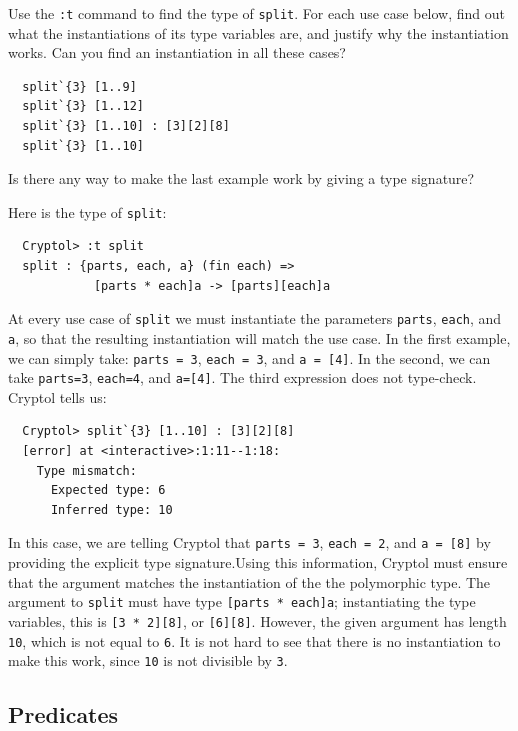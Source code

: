\begin{Exercise}\label{ex:poly:split}\indGroup
  Use the \texttt{:t} command to find the type of \texttt{split}. For
  each use case below, find out what the instantiations of its type
  variables are, and justify why the instantiation works. Can you find
  an instantiation in all these cases?
\begin{Verbatim}
  split`{3} [1..9]
  split`{3} [1..12]
  split`{3} [1..10] : [3][2][8]
  split`{3} [1..10]
\end{Verbatim}
Is there any way to make the last example work by giving a type signature?
\end{Exercise}
\begin{Answer}\indGroup
Here is the type of \texttt{split}:
\begin{Verbatim}
  Cryptol> :t split
  split : {parts, each, a} (fin each) =>
            [parts * each]a -> [parts][each]a
\end{Verbatim}
At every use case of \texttt{split} we must instantiate the parameters
\texttt{parts}, \texttt{each}, and \texttt{a}, so that the resulting
instantiation will match the use case. In the first example, we can
simply take: \texttt{parts = 3}, \texttt{each = 3}, and \texttt{a = [4]}. In
the second, we can take \texttt{parts=3}, \texttt{each=4}, and
\texttt{a=[4]}. The third expression does not type-check. Cryptol
tells us:
\begin{Verbatim}
  Cryptol> split`{3} [1..10] : [3][2][8]
  [error] at <interactive>:1:11--1:18:
    Type mismatch:
      Expected type: 6
      Inferred type: 10
\end{Verbatim}
In this case, we are telling Cryptol that \texttt{parts = 3},
\texttt{each = 2}, and \texttt{a = [8]} by providing the explicit type
signature.\indSignature Using this information, Cryptol must ensure
that the argument matches the instantiation of the the polymorphic
type. The argument to \texttt{split} must have type \texttt{[parts *
    each]a}; instantiating the type variables, this is \texttt{[3 *
    2][8]}, or \texttt{[6][8]}. However, the given argument has length
\texttt{10}, which is not equal to \texttt{6}. It is not hard to see
that there is no instantiation to make this work, since \texttt{10} is
not divisible by \texttt{3}.
\end{Answer}

\subsection{Predicates}
\label{sec:predicates}

